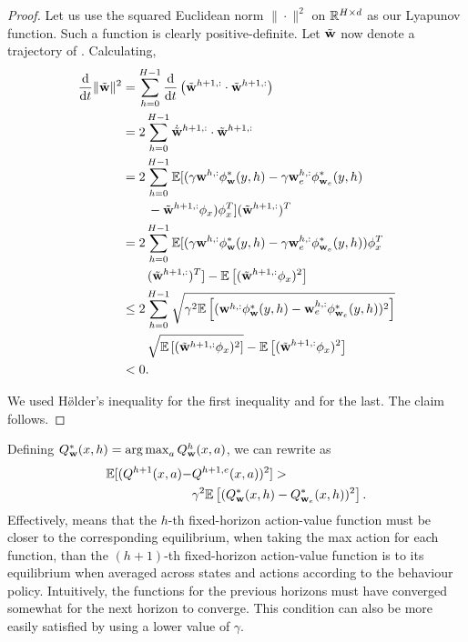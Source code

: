 \begin{appendices}
\begin{proof}
Let us use the squared Euclidean norm $\|\cdot\|^2$ on $\mathbb{R}^{H \times d}$ as our Lyapunov function. Such a function is clearly positive-definite. Let $\tilde{\mathbf{w}}$ now denote a trajectory of . Calculating,
\begin{align*}
    \dv{}{t}\|\tilde{\mathbf{w}}\|^2 &= \sum_{h = 0}^{H - 1}\dv{}{t} \left(\tilde{\mathbf{w}}^{h+1, :} \cdot \tilde{\mathbf{w}}^{h + 1, :}\right)\\
        &= 2\sum_{h = 0}^{H - 1} \dot{\tilde{\mathbf{w}}}^{h + 1, :} \cdot \tilde{\mathbf{w}}^{h + 1, :}\\
        &= 2 \sum_{h = 0}^{H - 1} \mathbb{E}[(\gamma \mathbf{w}^{h, :} \phi^*_{\mathbf{w}}(y, h) - \gamma \mathbf{w}_e^{h, :} \phi^*_{\mathbf{w}_e}(y, h) \\
        &\quad\quad - \tilde{\mathbf{w}}^{h + 1, :} \phi_x)\phi_x^T] (\tilde{\mathbf{w}}^{h + 1, :})^T\\
        &= 2\sum_{h = 0}^{H - 1} \mathbb{E}[(\gamma \mathbf{w}^{h, :} \phi^*_{\mathbf{w}}(y, h) - \gamma \mathbf{w}_e^{h, :} \phi^*_{\mathbf{w}_e}(y, h))\phi_x^T \\
    &\quad\quad (\tilde{\mathbf{w}}^{h + 1, :})^T] - \mathbb{E}\left[(\tilde{\mathbf{w}}^{h + 1, :} \phi_x)^2\right]\\
        &\leq 2\sum_{h = 0}^{H - 1} \sqrt{\gamma^2 \mathbb{E}\left[(\mathbf{w}^{h, :} \phi^*_{\mathbf{w}}(y, h) - \mathbf{w}_e^{h, :} \phi^*_{\mathbf{w}_e}(y, h))^2\right]}\\
        &\quad\quad \sqrt{\mathbb{E}\left[(\tilde{\mathbf{w}}^{h + 1, :} \phi_x )^2 \right]} - \mathbb{E}\left[(\tilde{\mathbf{w}}^{h + 1, :} \phi_x)^2\right]\\
        &< 0.
\end{align*}

\noindent We used H\"\o lder's inequality for the first inequality and  for the last. The claim follows.
\end{proof}

\noindent Defining $Q^*_{\mathbf{w}}(x, h) = \operatorname*{arg\,max}_a Q_{\mathbf{w}}^h(x, a)$, we can rewrite  as
\begin{align}\label{eq:odex-bound-2}
    \mathbb{E}[(Q^{h + 1}(x, a) - &Q^{h + 1, e}(x, a))^2] >\\ &\gamma^2 \mathbb{E}\left[(Q^*_{\mathbf{w}}(x, h) - Q_{\mathbf{w}_e}^*(x, h))^2\right]. \nonumber
\end{align}
Effectively,  means that the $h$-th fixed-horizon action-value function must be closer to the corresponding equilibrium, when taking the max action for each function, than the $(h + 1)$-th fixed-horizon action-value function is to its equilibrium when averaged across states and actions according to the behaviour policy. Intuitively, the functions for the previous horizons must have converged somewhat for the next horizon to converge. This condition can also be more easily satisfied by using a lower value of $\gamma$.


\end{appendices}
